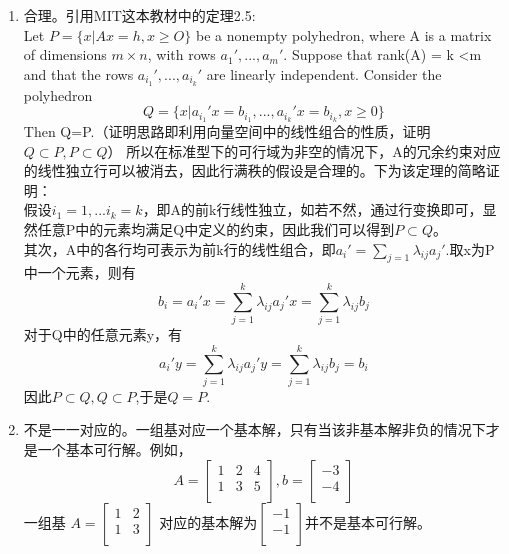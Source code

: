 \documentclass[10pt]{article}
\begin{document}
\begin{enumerate}
\item 合理。引用MIT这本教材中的定理2.5: \\
Let $P=\{x|Ax=h, x\ge O\}$ be a nonempty polyhe­dron, where A is a matrix of dimensions $m\times n$, with rows $a_1',...,a_m'$. Suppose that rank(A) = k <m and that the rows $a_{i_1}',...,a_{i_k}'$ are linearly independent. Consider the polyhedron
$$Q=\{x|a_{i_1}'x=b_{i_1},...,a_{i_k}'x=b_{i_k},x\ge0\}$$
Then Q=P.（证明思路即利用向量空间中的线性组合的性质，证明$Q\subset P,P\subset Q$）
所以在标准型下的可行域为非空的情况下，A的冗余约束对应的线性独立行可以被消去，因此行满秩的假设是合理的。下为该定理的简略证明：\\
假设$i_1=1,...i_k=k$，即A的前k行线性独立，如若不然，通过行变换即可，显然任意P中的元素均满足Q中定义的约束，因此我们可以得到$P\subset Q$。\\
其次，A中的各行均可表示为前k行的线性组合，即$a_i'=\sum_{j=1}\lambda_{ij}a_j'$.取x为P中一个元素，则有
$$b_i=a_i'x=\sum_{j=1}^k\lambda_{ij}a_j'x=\sum_{j=1}^k\lambda_{ij}b_j$$
对于Q中的任意元素y，有
$$a_i'y=\sum_{j=1}^{k}\lambda_{ij}a_j'y=\sum_{j=1}^k\lambda_{ij}b_j=b_i$$
因此$P\subset Q, Q\subset P$,于是$Q=P$.
\item 不是一一对应的。一组基对应一个基本解，只有当该非基本解非负的情况下才是一个基本可行解。例如，
	\begin{equation*}
	A=\left[
	\begin{array}{ccc}
	1 & 2 & 4 \\
	1 & 3 & 5 \\
	\end{array}
	\right], 
	b=\left[
	\begin{array}{c}
	-3 \\
	-4 \\
	\end{array}
	\right]
	\end{equation*}
	一组基
	$
	A=\left[
	\begin{array}{ccc}
	1 & 2  \\
	1 & 3  \\
	\end{array}
	\right]
	$	对应的基本解为$\left[
	\begin{array}{c}
	-1 \\
	-1 \\
	\end{array}
	\right]
	$并不是基本可行解。
\end{enumerate}
\end{document}
